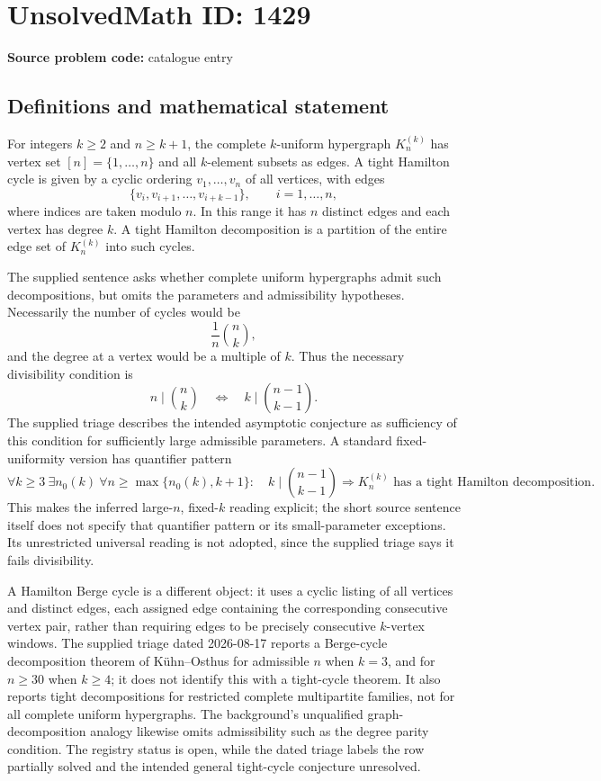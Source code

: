 \documentclass[11pt]{article}
\begin{document}
\section*{UnsolvedMath ID: 1429}
\textbf{Source problem code:} catalogue entry
\subsection{Definitions and mathematical statement}
For integers \(k\geq2\) and \(n\geq k+1\), the complete \(k\)-uniform hypergraph \(K_n^{(k)}\) has vertex set \([n]=\{1,\ldots,n\}\) and all \(k\)-element subsets as edges. A tight Hamilton cycle is given by a cyclic ordering \(v_1,\ldots,v_n\) of all vertices, with edges
\[
\{v_i,v_{i+1},\ldots,v_{i+k-1}\},\qquad i=1,\ldots,n,
\]
where indices are taken modulo \(n\). In this range it has \(n\) distinct edges and each vertex has degree \(k\). A tight Hamilton decomposition is a partition of the entire edge set of \(K_n^{(k)}\) into such cycles.

The supplied sentence asks whether complete uniform hypergraphs admit such decompositions, but omits the parameters and admissibility hypotheses. Necessarily the number of cycles would be
\[
\frac1n\binom nk,
\]
and the degree at a vertex would be a multiple of \(k\). Thus the necessary divisibility condition is
\[
n\mid\binom nk
\quad\Longleftrightarrow\quad
k\mid\binom{n-1}{k-1}.
\]
The supplied triage describes the intended asymptotic conjecture as sufficiency of this condition for sufficiently large admissible parameters. A standard fixed-uniformity version has quantifier pattern
\[
\forall k\geq3\ \exists n_0(k)\ \forall n\geq\max\{n_0(k),k+1\}:
\quad k\mid\binom{n-1}{k-1}
\Longrightarrow K_n^{(k)}\text{ has a tight Hamilton decomposition}.
\]
This makes the inferred large-\(n\), fixed-\(k\) reading explicit; the short source sentence itself does not specify that quantifier pattern or its small-parameter exceptions. Its unrestricted universal reading is not adopted, since the supplied triage says it fails divisibility.

A Hamilton Berge cycle is a different object: it uses a cyclic listing of all vertices and distinct edges, each assigned edge containing the corresponding consecutive vertex pair, rather than requiring edges to be precisely consecutive \(k\)-vertex windows. The supplied triage dated 2026-08-17 reports a Berge-cycle decomposition theorem of K\"uhn--Osthus for admissible \(n\) when \(k=3\), and for \(n\geq30\) when \(k\geq4\); it does not identify this with a tight-cycle theorem. It also reports tight decompositions for restricted complete multipartite families, not for all complete uniform hypergraphs. The background's unqualified graph-decomposition analogy likewise omits admissibility such as the degree parity condition. The registry status is open, while the dated triage labels the row partially solved and the intended general tight-cycle conjecture unresolved.
\end{document}
